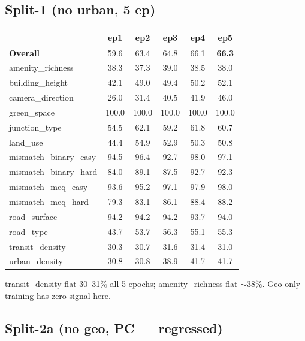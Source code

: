 \documentclass[11pt]{article}
\begin{document}
\newpage
\subsection*{Split-1 (no urban, 5 ep)}

\begin{table}[h]\centering\scriptsize
\setlength{\tabcolsep}{6pt}
\begin{tabular}{l c c c c c}
\toprule
& ep1 & ep2 & ep3 & ep4 & ep5 \\
\midrule
\textbf{Overall}      & 59.6 & 63.4 & 64.8 & 66.1 & \textbf{66.3} \\
amenity\_richness     & 38.3 & 37.3 & 39.0 & 38.5 & 38.0 \\
building\_height      & 42.1 & 49.0 & 49.4 & 50.2 & 52.1 \\
camera\_direction     & 26.0 & 31.4 & 40.5 & 41.9 & 46.0 \\
green\_space          & 100.0 & 100.0 & 100.0 & 100.0 & 100.0 \\
junction\_type        & 54.5 & 62.1 & 59.2 & 61.8 & 60.7 \\
land\_use             & 44.4 & 54.9 & 52.9 & 50.3 & 50.8 \\
mismatch\_binary\_easy& 94.5 & 96.4 & 92.7 & 98.0 & 97.1 \\
mismatch\_binary\_hard& 84.0 & 89.1 & 87.5 & 92.7 & 92.3 \\
mismatch\_mcq\_easy   & 93.6 & 95.2 & 97.1 & 97.9 & 98.0 \\
mismatch\_mcq\_hard   & 79.3 & 83.1 & 86.1 & 88.4 & 88.2 \\
road\_surface         & 94.2 & 94.2 & 94.2 & 93.7 & 94.0 \\
road\_type            & 43.7 & 53.7 & 56.3 & 55.1 & 55.3 \\
transit\_density      & 30.3 & 30.7 & 31.6 & 31.4 & 31.0 \\
urban\_density        & 30.8 & 30.8 & 38.9 & 41.7 & 41.7 \\
\bottomrule
\end{tabular}
\end{table}

transit\_density flat 30--31\% all 5 epochs; amenity\_richness flat $\sim$38\%. Geo-only training has zero signal here.

\subsection*{Split-2a (no geo, PC --- regressed)}
\end{document}
